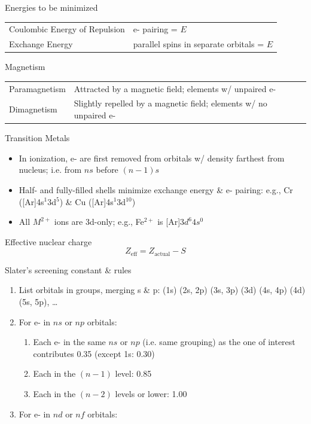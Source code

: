\documentclass[10pt,landscape]{article}
\newcommand{\tableindent}{\hspace{1.5em}}
\begin{document}
\begin{multicols}{3}
Energies to be minimized

\begin{tabular}{@{\tableindent}p{25mm}p{47mm}@{}}
	Coulombic Energy of Repulsion & \textdownarrow{} e- pairing = \textdownarrow{} $E$ \\
	Exchange Energy & \textuparrow{} parallel spins in separate orbitals = \textdownarrow{} $E$
\end{tabular}


Magnetism

\begin{tabular}{@{\tableindent}lp{5cm}@{}}
Paramagnetism & Attracted by a magnetic field; elements w/ unpaired e- \\
Dimagnetism & Slightly repelled by a magnetic field; elements w/ no unpaired e-
\end{tabular}

Transition Metals
\begin{itemize}
\item In ionization, e- are first removed from orbitals w/ density farthest from nucleus; i.e. from $ns$ before $(n-1)s$
\item Half- and fully-filled shells minimize exchange energy \& e- pairing: e.g., Cr ([Ar]4s$^1$3d$^{5}$) \& Cu  ([Ar]4s$^1$3d$^{10}$) 
\item All $M^{2+}$ ions are 3d-only; e.g.,  Fe$^{2+}$ is [Ar]$3d^{6}4s^0$
\end{itemize}  


Effective nuclear charge
\[ Z_\text{eff} = Z_\text{actual} - S \]

Slater's screening constant \& rules
\begin{enumerate}
\item List orbitals in groups, merging s \& p: (1s) (2s, 2p) (3s, 3p) (3d) (4s, 4p) (4d) (5s, 5p), \ldots 
\item For e- in $ns$ or $np$ orbitals:

	\begin{enumerate}
	\item Each e- in the same $ns$ or $np$ (i.e. same grouping) as the one of interest contributes 0.35 (except 1s: 0.30)
	\item Each in the $(n-1)$ level: 0.85
	\item Each in the $(n-2)$ levels or lower: 1.00
	\end{enumerate}

\item For e- in $nd$ or $nf$ orbitals:


\end{enumerate}
\end{multicols}
\end{document}
